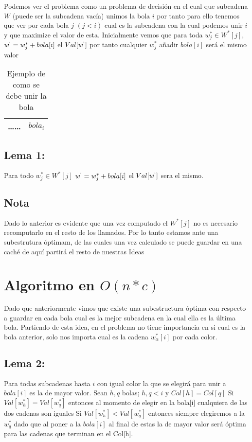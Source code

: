 \documentclass{article}
\begin{document}
Podemos ver el problema como un problema de decisión en el cual que subcadena $W$ (puede ser la subcadena vacía) unimos la bola $i$
por tanto para ello tenemos que ver por cada bola $j$ $(j<i)$ cual es la subcadena con la cual podemos unir $i$ y que 
maximize el valor de esta.
Inicialmente vemos que para toda $w^*_j \in W^*[j] $, $w^`=w^*_j + bola[i]$ el $Val[w^`]$ por tanto cualquier $w^*_j$
añadir $bola[i]$ será el mismo valor

\begin{table}
    \centering
    \begin{tabular}{|c|c|}
        \hline
        \dots \dots & $bola_i$\\
        \hline
    \end{tabular}
    \caption{Ejemplo de como se debe unir la bola}
\end{table}

\subsection{Lema 1: }
Para todo $w^*_j \in W^*[j] $ $w^`=w^*_j + bola[i]$  el $Val[w^`]$ sera el mismo.

\subsection{Nota}
Dado lo anterior es evidente que una vez computado el $W^*[j]$ no es necesario recomputarlo en el resto de los llamados.
Por lo tanto estamos ante una subestrutura óptimam, de las cuales una vez calculado se puede guardar en una caché
de aquí partirá el resto de nuestras Ideas


\section{Algoritmo en $O(n * c )$}
Dado que anteriormente vimos que existe una subestructura óptima con respecto a guardar en cada bola cual es la mejor 
subcadena en la cual ella es la última bola.
Partiendo de esta idea, en el problema no tiene importancia en si cual es la bola anterior, solo nos importa cual es la cadena $w^*_\alpha[i]$
por cada color. 


\subsection{Lema 2:}
Para todas subcadenas hasta $i$ con igual color la que se elegirá para unir a $bola[i]$ es la de mayor valor.
Sean $h,q$ bolas; $h,q <i$ y $Col[h] = Col[q]$
Si $Val[w^*_h] = Val[w^*_q]$ entonces al momento de elegir en la bola[i] cualquiera de las dos cadenas son iguales
Si $Val[w^*_h] < Val[w^*_q]$ entonces siempre elegiremos a la $w^*_q$ dado que al poner a la $bola[i]$ al final de estas
la de mayor valor será óptima para las cadenas que terminan en el Col[h].
\end{document}
